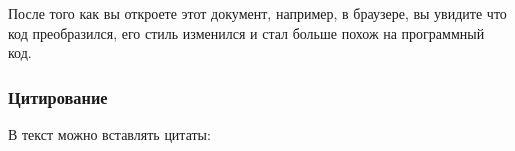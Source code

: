 \documentclass[letterpaper,10pt,russian]{sphinxmanual}
\begin{document}
\sphinxAtStartPar
После того как вы откроете этот документ, например, в браузере, вы увидите что код преобразился, его стиль изменился и стал больше похож на программный код.

\begin{sphinxVerbatim}[commandchars=\\\{\}]
   

   
        
          
          
           
\end{sphinxVerbatim}

\sphinxAtStartPar
{}


\subsubsection{Цитирование}
\label{\detokenize{educational_materials/docs/content:id10}}
\sphinxAtStartPar
В текст можно вставлять цитаты:

\sphinxAtStartPar
{}
\end{document}
